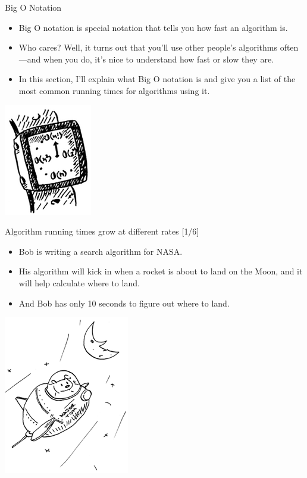 \documentclass[ignorenonframetext,]{beamer}
\providecommand{\tightlist}{%
  \setlength{\itemsep}{0pt}\setlength{\parskip}{0pt}}
\begin{document}
\begin{frame}{Big O Notation}
\protect\hypertarget{big-o-notation}{}

\begin{itemize}
\tightlist
\item
  Big O notation is special notation that tells you how fast an
  algorithm is.
\item
  Who cares? Well, it turns out that you'll use other people's
  algorithms often---and when you do, it's nice to understand how fast
  or slow they are.
\item
  In this section, I'll explain what Big O notation is and give you a
  list of the most common running times for algorithms using it.
\end{itemize}

\includegraphics{./Chapter01-figure/big_o_clock.png}

\end{frame}

\begin{frame}{Algorithm running times grow at different rates {[}1/6{]}}
\protect\hypertarget{algorithm-running-times-grow-at-different-rates-16}{}

\begin{itemize}
\tightlist
\item
  Bob is writing a search algorithm for NASA.
\item
  His algorithm will kick in when a rocket is about to land on the Moon,
  and it will help calculate where to land.
\item
  And Bob has only 10 seconds to figure out where to land.
\end{itemize}

\includegraphics{./Chapter01-figure/bob_rocket.png}

\end{frame}
\end{document}

